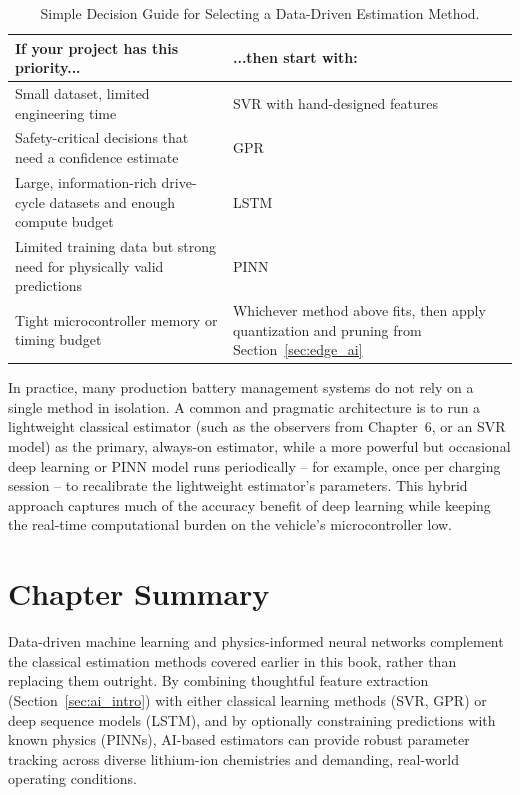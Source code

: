 \begin{table}[htbp]
\centering
\caption{Simple Decision Guide for Selecting a Data-Driven Estimation Method.}
\label{tab:ch8_decision_guide}
\renewcommand{\arraystretch}{1.3}
\footnotesize
\begin{tabularx}{\textwidth}{|X|p{3.2cm}|}
\hline
\textbf{If your project has this priority...} & \textbf{...then start with:} \\
\hline
Small dataset, limited engineering time & SVR with hand-designed features \\
\hline
Safety-critical decisions that need a confidence estimate & GPR \\
\hline
Large, information-rich drive-cycle datasets and enough compute budget & LSTM \\
\hline
Limited training data but strong need for physically valid predictions & PINN \\
\hline
Tight microcontroller memory or timing budget & Whichever method above fits, then apply quantization and pruning from Section~\ref{sec:edge_ai} \\
\hline
\end{tabularx}
\end{table}

In practice, many production battery management systems do not rely on a single method in isolation. A common and pragmatic architecture is to run a lightweight classical estimator (such as the observers from Chapter~6, or an SVR model) as the primary, always-on estimator, while a more powerful but occasional deep learning or PINN model runs periodically -- for example, once per charging session -- to recalibrate the lightweight estimator's parameters. This hybrid approach captures much of the accuracy benefit of deep learning while keeping the real-time computational burden on the vehicle's microcontroller low.


\section{Chapter Summary}
\label{sec:ch8_summary}

Data-driven machine learning and physics-informed neural networks complement the classical estimation methods covered earlier in this book, rather than replacing them outright. By combining thoughtful feature extraction (Section~\ref{sec:ai_intro}) with either classical learning methods (SVR, GPR) or deep sequence models (LSTM), and by optionally constraining predictions with known physics (PINNs), AI-based estimators can provide robust parameter tracking across diverse lithium-ion chemistries and demanding, real-world operating conditions.

